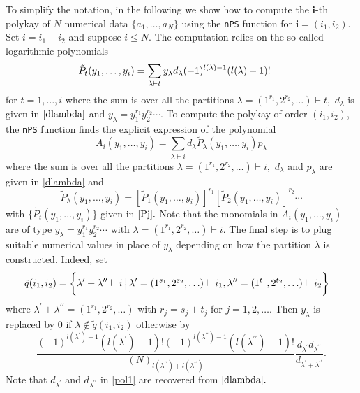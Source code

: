 To simplify the notation, in the following we show how to compute the
\(\boldsymbol{i}\)-th polykay of \(N\) numerical data
\(\{a_1, \ldots, a_N\}\) using the \texttt{nPS} function for
\(\boldsymbol{i} = (i_1, i_2)\). Set \(i=i_1+i_2\) and suppose
\(i \leq N.\) The computation relies on the so-called logarithmic
polynomials \begin{equation}\label{Pj}
\hskip-0.5cm \tilde{P}_{t}(y_1, \ldots, y_i) =  \sum_{\lambda \vdash t}  y_{\lambda} d_{\lambda} 
(-1)^{l(\lambda)-1} (l(\lambda)-1)! 
\end{equation} for \(t=1, \ldots, i\) where the sum is over all the
partitions \(\lambda=(1^{r_1},2^{r_2},\ldots) \vdash t,\)
\(d_{\lambda}\) is given in \(\eqref{dlambda}\) and
\(y_{\lambda} = y_1^{r_1} y_2^{r_2} \cdots.\) To compute the polykay of
order \((i_1, i_2)\), the \texttt{nPS} function finds the explicit
expression of the polynomial \begin{equation}\label{Qi2}
A_i (y_1, \ldots, y_i) = \sum_{\lambda \vdash i} d_{\lambda} \tilde{P}_{\lambda}(y_1, \ldots, y_i) p_{\lambda} 
\end{equation} where the sum is over all the partitions
\(\lambda=(1^{r_1},2^{r_2},\ldots) \vdash i,\) \(d_{\lambda}\) and
\(p_{\lambda}\) are given in \eqref{dlambda} and
\[\tilde{P}_{\lambda}(y_1, \ldots, y_i)  = [\tilde{P}_{1}(y_1, \ldots, y_i)]^{r_1} [\tilde{P}_{2}(y_1, \ldots, y_i)]^{r_2} \cdots\]
with \(\{\tilde{P}_{t}(y_1, \ldots, y_i)\}\) given in \(\eqref{Pj}.\)
Note that the monomials in \(A_i (y_1, \ldots, y_i)\) are of type
\(y_{\lambda}= y_1^{r_1} y_2^{r_2} \cdots\) with
\(\lambda = (1^{r_1}, 2^{r_2}, \ldots) \vdash i.\) The final step is to
plug suitable numerical values in place of \(y_{\lambda}\) depending on
how the partition \(\lambda\) is constructed. Indeed, set
\begin{equation} 
\hskip-0.5cm{\small \tilde{q}(i_1,i_2) = \bigg\{ \lambda^{\prime} + \lambda^{\prime \prime} \vdash i  \, \big| \, \lambda^{\prime}=(1^{s_1}, 2^{s_2}, \ldots) \vdash i_1, \lambda^{\prime \prime} = (1^{t_1}, 2^{t_2},\ldots) \vdash i_2\bigg\}} \!\!\!
\label{pol2}
\end{equation} where
\(\lambda^{\prime}+\lambda^{\prime \prime} = (1^{r_1}, 2^{r_2}, \ldots)\)
with \(r_j = s_j + t_j\) for \(j=1,2,\ldots.\) Then \(y_{\lambda}\) is
replaced by \(0\) if \(\lambda \not \in \tilde{q}(i_1,i_2)\) otherwise
by \begin{equation} 
\frac{(-1)^{l(\lambda^{\prime})-1}(l(\lambda^{\prime})-1)! (-1)^{l(\lambda^{\prime \prime})-1}(l(\lambda^{\prime \prime})-1)!}{(N)_{l(\lambda^{\prime \prime})+l(\lambda^{\prime \prime})}} \frac{d_{\lambda^{\prime}} d_{\lambda^{\prime \prime}}}{d_{\lambda^{\prime}+\lambda^{\prime \prime}}}.
\label{pol1}
\end{equation} Note that \(d_{\lambda^{\prime}}\) and
\(d_{\lambda^{\prime \prime}}\) in \eqref{pol1} are recovered from
\(\eqref{dlambda}.\)

